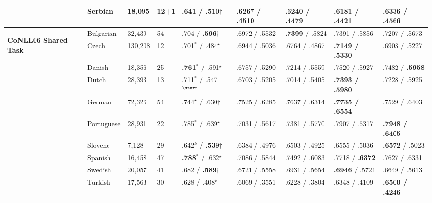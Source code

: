 \begin{table}[h]
\begin{flushleft}
\begin{tabular}{|l|l|l|l|l|l|l|l|l|}
        & Serbian    & 18,095  & 12+1 & .641 / \textbf{.510}$\dagger$        & .6267 / .4510 & .6240 / .4479 & .6181 / .4421     & \textbf{.6336} / .4566 \\
        \hline %
        \multirow{10}{*}{\begin{sideways}\textbf{CoNLL06 Shared Task}\end{sideways}}
        & Bulgarian  & 32,439  & 54   & .704 / \textbf{.596}$\dagger$        & .6972 / .5532 & \textbf{.7399} / .5824  & .7391 / .5856     & .7207 / .5673 \\
        & Czech      & 130,208 & 12   & .701$^*$ / .484$^\star$           & .6944 / .5036 & .6764 / .4867  & \textbf{.7149 / .5330}     & .6903 / .5227 \\
        & Danish     & 18,356  & 25   & \textbf{.761}$^*$ / .591$^\star$           & .6757 / .5290 & .7214 / .5559  & .7520 / .5927     & .7482 / \textbf{.5958} \\
        & Dutch      & 28,393  & 13   & .711$^*$ / .547$^\start$ & .6703 / .5205 & .7014 / .5405  & \textbf{.7393 / .5980}     & .7228 / .5925 \\
        & German     & 72,326  & 54   & .744$^\star$ / .630$\dagger$& .7525 / .6285 & .7637 / .6314  & \textbf{.7735 / .6554}     & .7529 / .6403 \\
        & Portuguese & 28,931  & 22   & .785$^*$ / .639$^\star$           & .7031 / .5617 & .7381 / .5770  & .7907 / .6317     & \textbf{.7948 / .6405} \\
        & Slovene    & 7,128   & 29   & .642$^k$ / \textbf{.539}$\dagger$    & .6384 / .4976 & .6503 / .4925  & .6555 / .5036     & \textbf{.6572} / .5023 \\
        & Spanish    & 16,458  & 47   & \textbf{.788}$^*$ / .632$^\star$          & .7086 / .5844 & .7492 / .6083  & .7718 / \textbf{.6372}     & .7627 / .6331 \\
        & Swedish    & 20,057  & 41   & .682 / \textbf{.589}$\dagger$        & .6721 / .5558 & .6931 / .5654  & \textbf{.6946} / .5721     & .6649 / .5613 \\
        & Turkish    & 17,563  & 30   & .628 / .408$^k$        & .6069 / .3551 & .6228 / .3804  & .6348 / .4109     & \textbf{.6500 / .4246} \\ \hline %
    \end{tabular}
  \end{flushleft}
  \label{multiresults}
\end{table}

